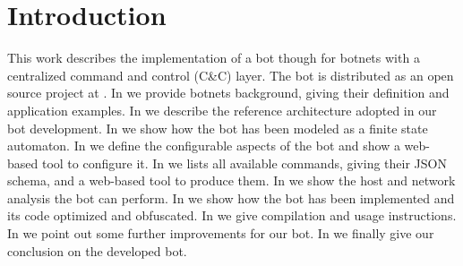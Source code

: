 \section{Introduction}
\label{sec:introduction}

This work describes the implementation of a bot though for botnets with a centralized command and control (C\&C) layer. The bot is distributed as an open source project at \cite{project-repo}.
In  we provide botnets background, giving their definition and application examples.
In  we describe the reference architecture adopted in our bot development.
In  we show how the bot has been modeled as a finite state automaton.
In  we define the configurable aspects of the bot and show a web-based tool to configure it.
In  we lists all available commands, giving their JSON schema, and a web-based tool to produce them.
In  we show the host and network analysis the bot can perform.
In  we show how the bot has been implemented and its code optimized and obfuscated.
In  we give compilation and usage instructions.
In  we point out some further improvements for our bot.
In  we finally give our conclusion on the developed bot.
